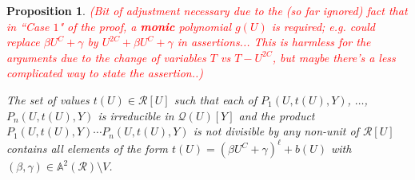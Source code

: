 \documentclass[11pt,a4paper,reqno]{amsart}
\newtheorem{prop}[thm]{Proposition}
\theoremstyle{definition}
\begin{document}
\begin{prop}
\textcolor{red}{(Bit of adjustment necessary due to the (so far ignored) fact that in ``Case $1$" of the proof, a {\bf monic} polynomial $g(U)$ is required; e.g. could replace $\beta U^C+\gamma$ by $U^{2C}+\beta U^C+\gamma$ in assertions... This is harmless for the arguments due to the  change of variables $T$ vs $T-U^{2C}$, but maybe there's a less complicated way to state the assertion..)}

The set of values $t(U)\in \mathcal R[U]$  such that each of $P_1(U,t(U), Y)$, $\dots$, $P_n(U, t(U), Y)$ is irreducible in $\mathcal Q(U)[Y]$ and the product $P_1(U,t(U),Y)\cdots P_n(U,t(U),Y)$ is not divisible by any non-unit of $\mathcal R[U]$ contains all elements of the form $t(U)=(\beta U^C+\gamma)^\ell + b(U)$ with $(\beta,\gamma)\in \mathbb{A}^2(\mathcal R)\setminus V$.
\end{prop}
\end{document}
